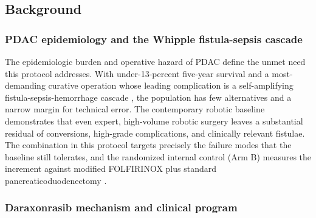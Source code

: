 \vspace{-0.7cm}

\subsection{Background}

\subsubsection*{PDAC epidemiology and the Whipple fistula-sepsis cascade}

The epidemiologic burden and operative hazard of PDAC define the unmet need this
protocol addresses. With under-13-percent five-year survival \cite{Siegel2025}
and a most-demanding curative operation whose leading complication is a
self-amplifying fistula-sepsis-hemorrhage cascade \cite{Bassi2017}, the
population has few alternatives and a narrow margin for technical error. The
contemporary robotic baseline \cite{DutchCohort2025} demonstrates that even
expert, high-volume robotic surgery leaves a substantial residual of conversions,
high-grade complications, and clinically relevant fistulae. The combination in
this protocol targets precisely the failure modes that the baseline still
tolerates, and the randomized internal control (Arm B) measures the increment
against modified FOLFIRINOX plus standard pancreaticoduodenectomy
\cite{Conroy2018}.

\subsubsection*{Daraxonrasib mechanism and clinical program}

